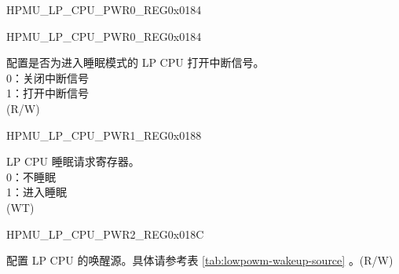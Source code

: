 \begin{register}{H}{PMU\_LP\_CPU\_PWR0\_REG}{0x0184}
\begin{regdesc}
\begin{reglist}
\item [见下页...]
\end{reglist}\end{regdesc}
\end{register}

\addtocounter{Regfloat}{-1}
\begin{register}{H}{PMU\_LP\_CPU\_PWR0\_REG}{0x0184}
\begin{regdesc}\begin{reglist}
\item [接上页...]

\label{fielddesc:PMULPCPUSLPBYPASSINTREN}\item [PMU\_LP\_CPU\_SLP\_BYPASS\_INTR\_EN] 配置是否为进入睡眠模式的 LP CPU 打开中断信号。\\
0：关闭中断信号\\
1：打开中断信号\\
(R/W)
\end{reglist}\end{regdesc}
\end{register}


\begin{register}{H}{PMU\_LP\_CPU\_PWR1\_REG}{0x0188}\label{regdesc:PMULPCPUPWR1REG}
%
%
\regnewline%
\begin{regdesc}\begin{reglist}
\label{fielddesc:PMULPCPUSLEEPREQ}\item [PMU\_LP\_CPU\_SLEEP\_REQ] LP CPU 睡眠请求寄存器。\\
0：不睡眠\\
1：进入睡眠\\
(WT)
\end{reglist}\end{regdesc}
\end{register}


\begin{register}{H}{PMU\_LP\_CPU\_PWR2\_REG}{0x018C}\label{regdesc:PMULPCPUPWR2REG}
%
%
\regnewline%
\begin{regdesc}\begin{reglist}
\label{fielddesc:PMULPCPUWAKEUPEN}\item [PMU\_LP\_CPU\_WAKEUP\_EN] 配置 LP CPU 的唤醒源。具体请参考表 \ref{tab:lowpowm-wakeup-source} \textit{}。(R/W)
\end{reglist}\end{regdesc}
\end{register}


